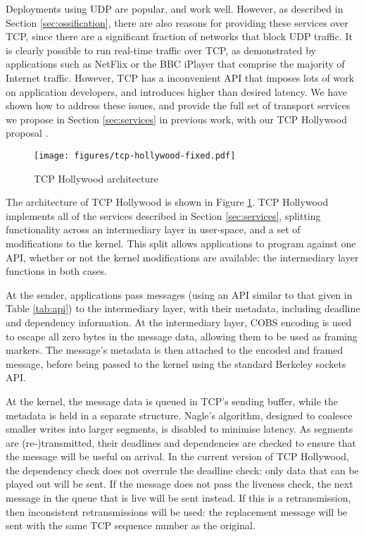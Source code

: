 \documentclass{sig-alternate-05-2015}
\begin{document}
Deployments using UDP are popular, and work well. However, as described in
Section \ref{sec:ossification}, there are also reasons for providing these
services over TCP, since there are a significant fraction of networks that
block UDP traffic. It is clearly possible to run real-time traffic over
TCP, as demonstrated by applications such as NetFlix or the BBC iPlayer
that comprise the majority of Internet traffic. However, TCP has a
inconvenient API that imposes lots of work on application developers, and
introduces higher than desired latency. We have shown how to address these
issues, and provide the full set of transport services we propose in
Section \ref{sec:services} in previous work, with our TCP Hollywood
proposal \cite{mcquistin2016tcp}.

\begin{figure}[t]
 \centering
  \texttt{[image: figures/tcp-hollywood-fixed.pdf]}
  \caption{TCP Hollywood architecture}
\label{diagram:tcp-hollywood}
\end{figure}

The architecture of TCP Hollywood is shown in Figure
\ref{diagram:tcp-hollywood}. TCP Hollywood implements all of the services
described in Section \ref{sec:services}, splitting functionality across
an intermediary layer in user-space, and a set of modifications to the
kernel. This split allows applications to program against one API, whether
or not the kernel modifications are available: the intermediary layer
functions in both cases.

At the sender, applications pass messages (using an API similar to that
given in Table \ref{tab:api}) to the intermediary layer, with their
metadata, including deadline and dependency information. At the
intermediary layer, COBS encoding \cite{CB97COBS} is used to escape all
zero bytes in the message data, allowing them to be used as framing
markers. The message's metadata is then attached to the encoded and framed
message, before being passed to the kernel using the standard Berkeley
sockets API.

At the kernel, the message data is queued in TCP's sending buffer, while
the metadata is held in a separate structure. Nagle's algorithm, designed
to coalesce smaller writes into larger segments, is disabled to minimise
latency. As segments are (re-)transmitted, their deadlines and dependencies
are checked to ensure that the message will be useful on arrival. In the
current version of TCP Hollywood, the dependency check does not overrule
the deadline check: only data that can be played out will be sent. If the
message does not pass the liveness check, the next message in the queue
that is live will be sent instead. If this is a retransmission, then
inconsistent retransmissions will be used: the replacement message will be
sent with the same TCP sequence number as the original.
\end{document}

